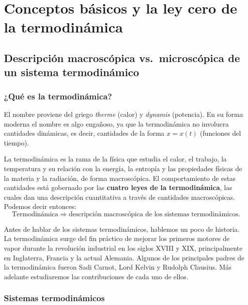 \chapter{Conceptos básicos y la ley cero de la termodinámica}

\section{Descripción macroscópica vs.\ microscópica de un sistema termodinámico}

\subsection*{¿Qué es la termodinámica?}

El nombre proviene del griego \emph{therme} (calor) y \emph{dynamis} (potencia).
En su forma moderna el nombre es algo engañoso, ya que la termodinámica no involucra
cantidades dinámicas, es decir, cantidades de la forma $x=x(t)$ (funciones del tiempo).

La termodinámica es la rama de la física que estudia el calor, el trabajo, la temperatura y su
relación con la energía, la entropía y las propiedades físicas de la materia y la radiación,
de forma macroscópica. El comportamiento de estas cantidades está gobernado por las
\textbf{cuatro leyes de la termodinámica}, las cuales dan una descripción cuantitativa a través
de cantidades macroscópicas. Podemos decir entonces:
\begin{equation*}
  \text{Termodinámica}\;\Longrightarrow\;\text{descripción macroscópica de los sistemas termodinámicos.}
\end{equation*}

Antes de hablar de los sistemas termodinámicos, hablemos un poco de historia. La termodinámica
surge del fin práctico de mejorar los primeros motores de vapor durante la revolución industrial
en los siglos XVIII y XIX, principalmente en Inglaterra, Francia y la actual Alemania. Algunos de
los principales padres de la termodinámica fueron Sadi Carnot, Lord Kelvin y Rudolph Clausius.
Más adelante estudiaremos las contribuciones de cada uno de ellos.

\subsection*{Sistemas termodinámicos}

